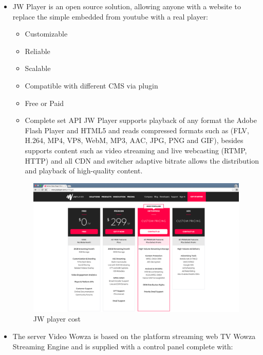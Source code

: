 \begin{itemize}
\item JW Player is an open source solution, allowing anyone with a website to replace the simple embedded from youtube with a real player:

\begin{itemize}
\item Customizable
\item Reliable
\item Scalable
\item Compatible with different CMS via plugin
\item Free or Paid
\item Complete set API
JW Player supports playback of any format the Adobe Flash Player and HTML5 and reads compressed formats such as (FLV, H.264, MP4, VP8, WebM, MP3, AAC, JPG, PNG and GIF), besides supports content such as video streaming and live webcasting (RTMP, HTTP) and all CDN and switcher adaptive bitrate allows the distribution and playback of high-quality content.
\end{itemize}


\begin{figure}[htb]
 \centering
 \includegraphics[width=1.0\linewidth]{images/chapter3/jwtPLayer.png}\hfill
 \caption[JW player cost]{JW player cost}
 \label{fig:fourV}
\end{figure}

\newpage 

\item The server Video Wowza is based on the platform streaming web TV Wowza Streaming Engine and is supplied with a control panel complete with:
\begin{itemize}


\end{itemize}
\end{itemize}

